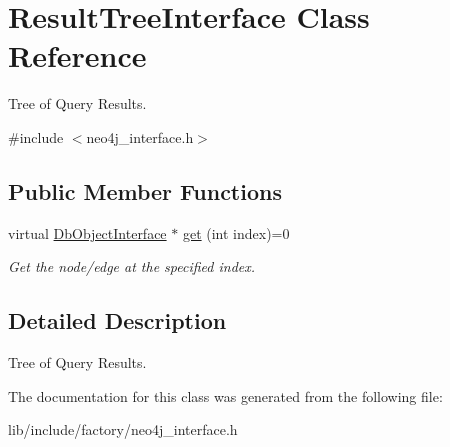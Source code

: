 \hypertarget{classResultTreeInterface}{\section{Result\-Tree\-Interface Class Reference}
\label{classResultTreeInterface}
}


Tree of Query Results.  




{\ttfamily \#include $<$neo4j\-\_\-interface.\-h$>$}

\subsection*{Public Member Functions}
\begin{DoxyCompactItemize}
\item 
\hypertarget{classResultTreeInterface_acc4e0493661f5f2b0b836c7a1bdb3a8f}{virtual \hyperlink{classDbObjectInterface}{Db\-Object\-Interface} $\ast$ \hyperlink{classResultTreeInterface_acc4e0493661f5f2b0b836c7a1bdb3a8f}{get} (int index)=0}\label{classResultTreeInterface_acc4e0493661f5f2b0b836c7a1bdb3a8f}

\begin{DoxyCompactList}\small\item\em Get the node/edge at the specified index. \end{DoxyCompactList}\end{DoxyCompactItemize}


\subsection{Detailed Description}
Tree of Query Results. 

The documentation for this class was generated from the following file\-:\begin{DoxyCompactItemize}
\item 
lib/include/factory/neo4j\-\_\-interface.\-h\end{DoxyCompactItemize}
